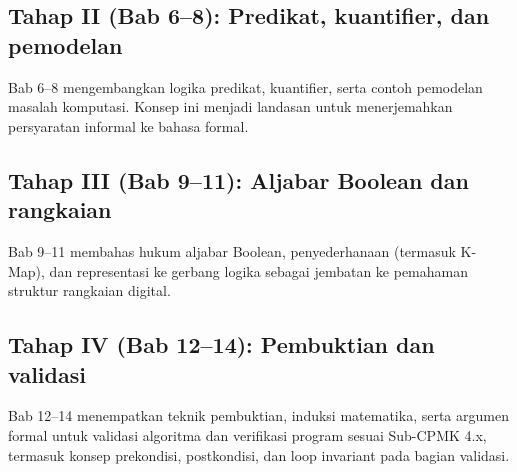 \subsection{Tahap II (Bab 6--8): Predikat, kuantifier, dan pemodelan}
Bab 6--8 mengembangkan logika predikat, kuantifier, serta contoh pemodelan masalah komputasi. Konsep ini menjadi landasan untuk menerjemahkan persyaratan informal ke bahasa formal.

\subsection{Tahap III (Bab 9--11): Aljabar Boolean dan rangkaian}
Bab 9--11 membahas hukum aljabar Boolean, penyederhanaan (termasuk K-Map), dan representasi ke gerbang logika sebagai jembatan ke pemahaman struktur rangkaian digital.

\subsection{Tahap IV (Bab 12--14): Pembuktian dan validasi}
Bab 12--14 menempatkan teknik pembuktian, induksi matematika, serta argumen formal untuk validasi algoritma dan verifikasi program sesuai Sub-CPMK 4.x, termasuk konsep prekondisi, postkondisi, dan loop invariant pada bagian validasi.
